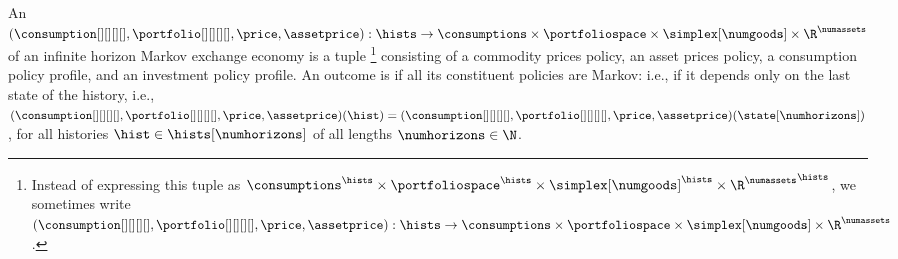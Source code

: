 An  $(\consumption[][][][], \portfolio[][][][], \price, \assetprice): \hists \to \consumptions \times \portfoliospace \times \simplex[\numgoods] \times \R^\numassets$ of an infinite horizon Markov exchange economy is a tuple%
\footnote{Instead of expressing this tuple as $\consumptions^{\hists} \times \portfoliospace^{\hists} \times \simplex[\numgoods]^{\hists} \times {\R^\numassets}^{\hists}$, we sometimes write $(\consumption[][][][], \portfolio[][][][], \price, \assetprice): \hists \to \consumptions \times \portfoliospace \times \simplex[\numgoods] \times \R^\numassets$.}
consisting of a commodity prices policy, an asset prices policy, a consumption policy profile, and an investment policy profile. 
An outcome is  if all its constituent policies are Markov: i.e., if it depends only on the last state of the history, i.e., $(\consumption[][][][], \portfolio[][][][], \price, \assetprice)(\hist) = (\consumption[][][][], \portfolio[][][][], \price, \assetprice)(\state[\numhorizons])$, for all histories $\hist \in \hists[\numhorizons]$ of all lengths $\numhorizons \in \N$.


